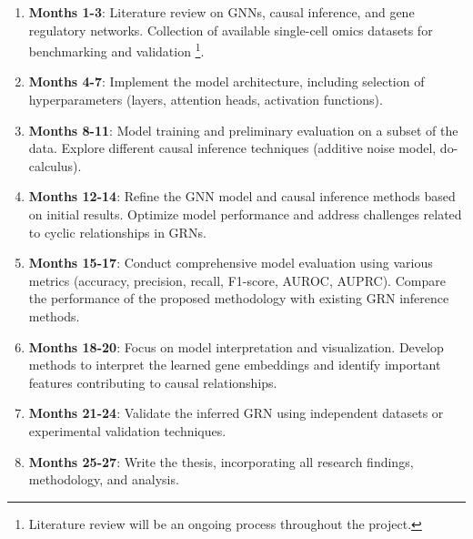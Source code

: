 
\begin{enumerate}[label=(\arabic*)]
    \setlength{\itemsep}{0pt}
    \item \textbf{Months 1-3}: Literature review on GNNs, causal inference, and gene regulatory networks. Collection of available single-cell omics datasets for benchmarking and validation \footnote{Literature review will be an ongoing process throughout the project.}.
    \item  \textbf{Months 4-7}: Implement the model architecture, including selection of hyperparameters (layers, attention heads, activation functions).
    \item \textbf{Months 8-11}: Model training and preliminary evaluation on a subset of the data. Explore different causal inference techniques (additive noise model, do-calculus).
    \item \textbf{Months 12-14}: Refine the GNN model and causal inference methods based on initial results. Optimize model performance and address challenges related to cyclic relationships in GRNs.
    \item  \textbf{Months 15-17}: Conduct comprehensive model evaluation using various metrics (accuracy, precision, recall, F1-score, AUROC, AUPRC). Compare the performance of the proposed methodology with existing GRN inference methods. 
    \item \textbf{Months 18-20}: Focus on model interpretation and visualization. Develop methods to interpret the learned gene embeddings and identify important features contributing to causal relationships.
    \item \textbf{Months 21-24}: Validate the inferred GRN using independent datasets or experimental validation techniques.
    \item \textbf{Months 25-27}: Write the thesis, incorporating all research findings, methodology, and analysis.
\end{enumerate}